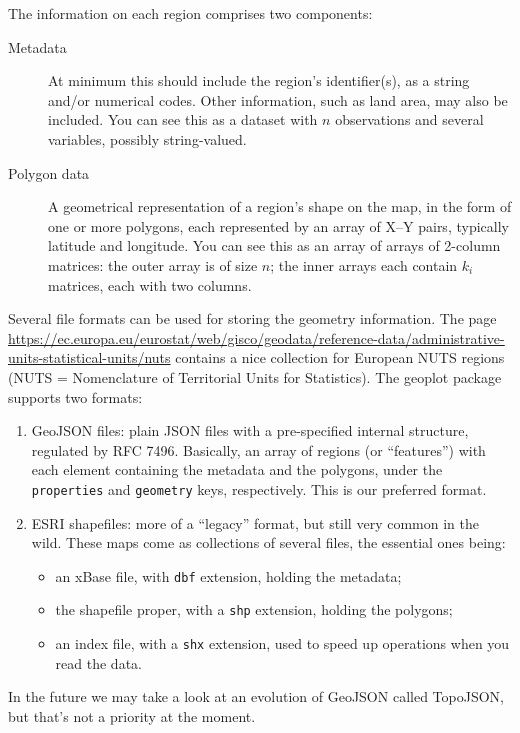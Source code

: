 \documentclass{article}
\begin{document}
The information on each region comprises two components:
\begin{description}
\item[Metadata] At minimum this should include the region's
  identifier(s), as a string and/or numerical codes. Other
  information, such as land area, may also be included. You can see
  this as a dataset with $n$ observations and several variables,
  possibly string-valued.
\item[Polygon data] A geometrical representation of a region's shape
  on the map, in the form of one or more polygons, each represented by
  an array of X--Y pairs, typically latitude and longitude. You can
  see this as an array of arrays of 2-column matrices: the outer array
  is of size $n$; the inner arrays each contain $k_i$ matrices, each
  with two columns.
\end{description}

Several file formats can be used for storing the geometry information.
The page
\url{https://ec.europa.eu/eurostat/web/gisco/geodata/reference-data/administrative-units-statistical-units/nuts}
contains a nice collection for European NUTS regions (NUTS =
Nomenclature of Territorial Units for Statistics).  The
\textsf{geoplot} package supports two formats:
\begin{enumerate}
\item GeoJSON files: plain JSON files with a
  pre-specified internal structure, regulated by RFC 7496. Basically,
  an array of regions (or ``features'') with each element containing
  the metadata and the polygons, under the \texttt{properties} and
  \texttt{geometry} keys, respectively.  This is our preferred format.
\item ESRI shapefiles: more of a ``legacy'' format, but still very
  common in the wild. These maps come as collections of several files,
  the essential ones being:
  \begin{itemize}
  \item an xBase file, with \texttt{dbf} extension, holding the
    metadata;
  \item the shapefile proper, with a \texttt{shp} extension, holding the
    polygons;
  \item an index file, with a \texttt{shx} extension, used to speed up
    operations when you read the data.
  \end{itemize}
\end{enumerate}

In the future we may take a look at an evolution of GeoJSON called
TopoJSON, but that's not a priority at the moment.
\end{document}
